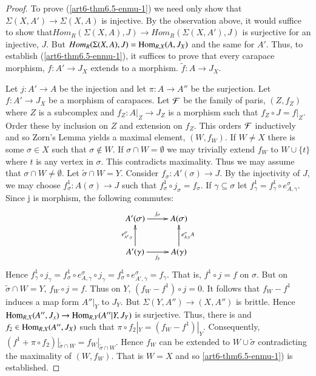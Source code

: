 \begin{proof}
To prove (\ref{art6-thm6.5-enmu-1}) we need only show that $\Sigma(X, A') \rightarrow \Sigma(X, A)$ is injective. By the observation above, it would suffice to show that\break $Hom_{R}(\Sigma(X, A), J) \rightarrow Hom_{R}(\Sigma(X, A'), J)$ is surjective for an injective, $J$. But $Hom_{R}(\Sigma(X, A), J) = \operatorname{Hom}_{R, X}(A, J_{X})$ and the same for $A'$. Thus, to establish (\ref{art6-thm6.5-enmu-1}), it suffices to prove that every carapace morphism, $f:A'\rightarrow J_{X}$ extends to a morphism. $\tilde{f}: A\rightarrow J_{X}$.

Let $j : A' \rightarrow A$ be the injection and let $\pi : A\rightarrow A''$ be the surjection. Let $f: A' \rightarrow J_{X}$ be a morphism of carapaces. Let $\mathcal{F}$ be the family of paris, $(Z, f_{Z})$ where $Z$ is a subcomplex and $f_{Z}:A|_{Z} \rightarrow J_{Z}$ is a morphism such that $f_{Z}\circ J = f|_{Z}$. Order these by inclusion on $Z$ and extension on $f_{Z}$. This orders $\mathcal{F}$ inductively and so Zorn's Lemma yields a maximal element, $(W, f_{W})$. If $W \neq X$ there is some $\sigma \in X$ such that $\sigma \notin W$. If $\sigma \cap W = \emptyset$ we may trivially extend $f_{W}$ to $W \cup \{t\}$ where $t$ is any vertex in $\sigma$. This contradicts maximality. Thus we may assume that $\sigma \cap W \neq \emptyset$. Let $\tilde{\sigma} \cap W =Y$. Consider $f_{\sigma} : A'(\sigma)\rightarrow J$. By the injectivity of $J$, we may choose $f_{\sigma}^{1}: A(\sigma) \rightarrow J$ such  that $f_{\sigma}^{1} \circ j_{\sigma} = f_{\sigma}$.  If $\gamma \subseteq \sigma$ let $f_{\gamma}^{1}=f_{\gamma}^{1} \circ e_{A, \gamma}^{\sigma}$. Since j is morphism, the following commutes:
$$
\xymatrix{ 
\ar@{}[dr]|{}
A'(\sigma) \ar[r]^-{j_{\sigma}} & A(\sigma)  \\
 A'(\gamma)\ar[u]^-{e_{A', \gamma}^{\sigma}}\ar[r]_-{j_{\gamma}} & A(\gamma)\ar[u]_-{e_{A, \gamma}^{\sigma} A}  }
$$
Hence $f_{\gamma}^{1} \circ j_{\gamma} = f_{\sigma}^{1}\circ e_{A, \gamma}^{\sigma}\circ j_{\gamma} = f_{\sigma}^{1}\circ e_{A', \gamma}^{\sigma} = f_{\gamma}$. That is, $f^{1} \circ j = f$ on $\sigma$. But on
$\tilde{\sigma} \cap W = Y$, $f_{W}\circ j = f$. Thus on $Y$, $(f_{W}-f^{1})\circ j =0$. It follows that $f_{W}-f^{1}$ induces a map form $A''|_{Y}$ to $J_{Y}$. But $\Sigma(Y, A'')\rightarrow (X, A'')$ is brittle. Hence $\operatorname{Hom}_{R, X}(A'', J_{x})\rightarrow \operatorname{Hom}_{R, Y}(A''|Y, J_{Y})$ is surjective. Thus, there is and $f_{2} \in \operatorname{Hom}_{R, X}(A'', J_{X})$ such that $\pi \circ f_{2}|_{Y} =  (f_{W}-f^{1})|_{Y}$. Consequently, $(f^{1}+ \pi \circ f_{2})|_{\tilde{\sigma}\cap W}=f_{W}|_{\tilde{\sigma}\cap W}$. Hence $f_{W}$ can be extended to $W\cup \tilde{\sigma}$ contradicting the maximality of $(W, f_{W})$. That is $W = X$ and so \ref{art6-thm6.5-enmu-1}) is established.


\end{proof}
